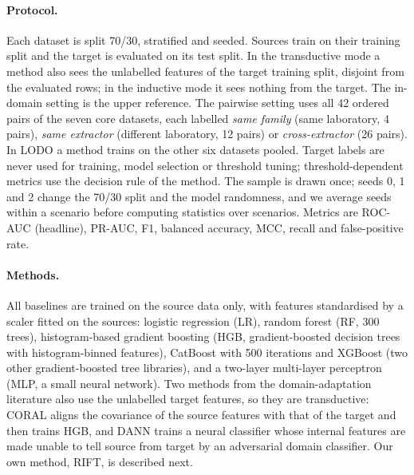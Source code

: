 \documentclass[pdflatex,sn-mathphys-num]{sn-jnl}%
\begin{document}
\paragraph{Protocol.}
Each dataset is split 70/30, stratified and seeded.
Sources train on their training split and the target is evaluated on its test split.
In the transductive mode a method also sees the unlabelled features of the target training split, disjoint from the evaluated rows; in the inductive mode it sees nothing from the target.
The in-domain setting is the upper reference.
The pairwise setting uses all 42 ordered pairs of the seven core datasets, each labelled \emph{same family} (same laboratory, 4 pairs), \emph{same extractor} (different laboratory, 12 pairs) or \emph{cross-extractor} (26 pairs).
In LODO a method trains on the other six datasets pooled.
Target labels are never used for training, model selection or threshold tuning; threshold-dependent metrics use the decision rule of the method.
The sample is drawn once; seeds 0, 1 and 2 change the 70/30 split and the model randomness, and we average seeds within a scenario before computing statistics over scenarios.
Metrics are ROC-AUC (headline), PR-AUC, F1, balanced accuracy, MCC, recall and false-positive rate.

\paragraph{Methods.}\label{sec:benchmeth}
All baselines are trained on the source data only, with features standardised by a scaler fitted on the sources: logistic regression (LR), random forest (RF, 300 trees), histogram-based gradient boosting (HGB, gradient-boosted decision trees with histogram-binned features), CatBoost \citep{prokhorenkova2018catboost} with 500 iterations and XGBoost (two other gradient-boosted tree libraries), and a two-layer multi-layer perceptron (MLP, a small neural network).
Two methods from the domain-adaptation literature also use the unlabelled target features, so they are transductive: CORAL \citep{sun2016coral} aligns the covariance of the source features with that of the target and then trains HGB, and DANN \citep{ganin2016dann} trains a neural classifier whose internal features are made unable to tell source from target by an adversarial domain classifier.
Our own method, RIFT, is described next.
\end{document}
